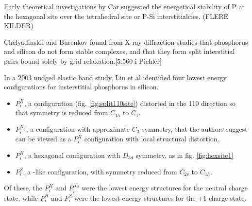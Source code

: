 \documentclass[11pt,bibliography=totoc,index=totoc]{scrbook}   %
\begin{document}
Early theoretical investigations by Car\cite{Car:1985} suggested the energetical stability of P at the hexagonal site over the tetrahedral site or P-Si interstitialcies. (FLERE KILDER)

Chelyadinskii and Burenkov found from X-ray diffraction studies that phosphorus and silicon do not form stable complexes, and that they form split interstitial pairs bound solely by grid relaxation.[5.560 i Pichler]

In a 2003 nudged elastic band study, Liu et al identified four lowest energy configurations for insterstitial phosphorus in silicon.
\begin{itemize}
  \item $P_i^X$, a  configuration (fig. \ref{fig:split110site}) distorted in the 110 direction so that symmetry is reduced from $C_{1h}$ to $C_1$.
  \item $P_i^{X_2}$, a configuration with approximate $C_2$ symmetry, that the authors suggest can be viewed as a $P_i^X$ configuration with local structural distortion.
  \item $P_i^H$, a hexagonal configuration with $D_{3d}$ symmetry, as in fig. \ref{fig:hexsite1}
  \item $P_i^S$, a -like configuration, with symmetry reduced from $C_{2v}$ to $C_{1h}$.
\end{itemize}
Of these, the $P_i^X$ and $P_i^{X_2}$ were the lowest energy structures for the neutral charge state, while $P_i^H$ and $P_i^S$ were the lowest energy structures for the +1 charge state.\cite{Liu:2003}





\end{document}
